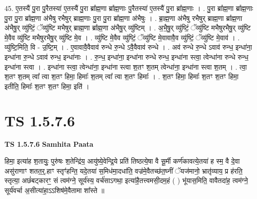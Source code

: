 \documentclass[17pt]{extarticle}
\begin{document}
45. ए॒तस्यै॑ पु॒रा पु॒रैतस्या॑ ए॒तस्यै॑ पु॒रा ब्रा᳚ह्म॒णा ब्रा᳚ह्म॒णाः पु॒रैतस्या॑ ए॒तस्यै॑ पु॒रा ब्रा᳚ह्म॒णाः । . पु॒रा ब्रा᳚ह्म॒णा ब्रा᳚ह्म॒णाः पु॒रा पु॒रा ब्रा᳚ह्म॒णा अ॑भैषु रभैषुर् ब्राह्म॒णाः पु॒रा पु॒रा ब्रा᳚ह्म॒णा अ॑भैषुः । . ब्रा॒ह्म॒णा अ॑भैषु रभैषुर् ब्राह्म॒णा ब्रा᳚ह्म॒णा अ॑भैषु॒र् व्यु॑ष्टिं॒ ॅव्यु॑ष्टि मभैषुर् ब्राह्म॒णा ब्रा᳚ह्म॒णा अ॑भैषु॒र् व्यु॑ष्टिम् । . अ॒भै॒षु॒र् व्यु॑ष्टिं॒ ॅव्यु॑ष्टि मभैषुरभैषु॒र् व्यु॑ष्टि मे॒वैव व्यु॑ष्टि मभैषुरभैषु॒र् व्यु॑ष्टि मे॒व । . व्यु॑ष्टि मे॒वैव व्यु॑ष्टिं॒ ॅव्यु॑ष्टि मे॒वावावै॒व व्यु॑ष्टिं॒ ॅव्यु॑ष्टि मे॒वाव॑ । . व्यु॑ष्टि॒मिति॒ वि - उ॒ष्टि॒म् । . ए॒वावावै॒वैवाव॑ रुन्धे रु॒न्धे ऽवै॒वैवाव॑ रुन्धे । . अव॑ रुन्धे रु॒न्धे ऽवाव॑ रुन्ध॒ इन्धा॑ना॒ इन्धा॑ना रु॒न्धे ऽवाव॑ रुन्ध॒ इन्धा॑नाः । . रु॒न्ध॒ इन्धा॑ना॒ इन्धा॑ना रुन्धे रुन्ध॒ इन्धा॑ना स्त्वा॒ त्वेन्धा॑ना रुन्धे रुन्ध॒ इन्धा॑ना स्त्वा । . इन्धा॑ना स्त्वा॒ त्वेन्धा॑ना॒ इन्धा॑ना स्त्वा श॒तꣳ श॒तम् त्वेन्धा॑ना॒ इन्धा॑ना स्त्वा श॒तम् । . त्वा॒ श॒तꣳ श॒तम् त्वा᳚ त्वा श॒तꣳ हिमा॒ हिमाः᳚ श॒तम् त्वा᳚ त्वा श॒तꣳ हिमाः᳚ । . श॒तꣳ हिमा॒ हिमाः᳚ श॒तꣳ श॒तꣳ हिमा॒ इतीति॒ हिमाः᳚ श॒तꣳ श॒तꣳ हिमा॒ इति॑ । \newline
\pagebreak
{}
\section*{ TS 1.5.7.6 }

\textbf{TS 1.5.7.6 } \newline
\textbf{Samhita Paata} \newline

हिमा॒ इत्या॑ह श॒तायुः॒ पुरु॑षः श॒तेन्द्रि॑य॒ आयु॑ष्ये॒वेन्द्रि॒ये प्रति॑ तिष्ठत्ये॒षा वै सू॒र्मी कर्ण॑कावत्ये॒तया॑ ह स्म॒ वै दे॒वा असु॑राणाꣳ शतत॒र्॒.हाꣳ स्तृꣳ॑हन्ति॒ यदे॒तया॑ स॒मिध॑मा॒दधा॑ति॒ वज्र॑मे॒वैतच्छ॑त॒घ्नीं ॅयज॑मानो॒ भ्रातृ॑व्याय॒ प्र ह॑रति॒ स्तृत्या॒ अछं॑बट्कारꣳ॒॒ सं त्वम॑ग्ने॒ सूर्य॑स्य॒ वर्च॑साऽगथा॒ इत्या॑है॒तत्त्वमसी॒दम॒हं ( ) भू॑यास॒मिति॒ वावैतदा॑ह॒ त्वम॑ग्ने॒ सूर्य॑वर्चा अ॒सीत्या॑हा॒ऽऽशिष॑मे॒वैतामा शा᳚स्ते ॥ \newline
\end{document}

